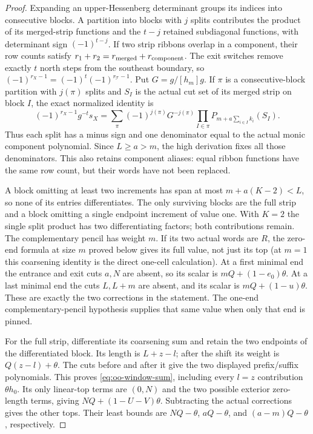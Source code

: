 \documentclass[11pt,a4paper]{amsart}
\numberwithin{equation}{section}
\theoremstyle{plain}
\theoremstyle{definition}
\begin{document}
\begin{proof}
Expanding an upper-Hessenberg determinant groups its indices into consecutive
blocks.  A partition into blocks with \(j\) splits contributes the product
of its merged-strip functions and the \(t-j\) retained subdiagonal functions,
with determinant sign \((-1)^{t-j}\).  If two strip ribbons overlap in a
component, their row counts satisfy
\(r_1+r_2=r_{\rm merged}+r_{\rm component}\).
The exit switches remove exactly \(t\) north steps from the southeast
boundary, so \((-1)^{r_X-1}=(-1)^t(-1)^{r_{\mathcal T}-1}\).
Put \(G=g/[h_m]g\).  If \(\pi\) is a consecutive-block partition with
\(j(\pi)\) splits and \(S_I\) is the actual cut set of its merged strip
on block \(I\), the exact normalized identity is
\[
 (-1)^{r_X-1}g^{-t}s_X
 =\sum_\pi(-1)^{j(\pi)}G^{-j(\pi)}
   \prod_{I\in\pi}P_{m+a\sum_{i\in I}k_i}(S_I).
\]
Thus each split has a minus sign and one denominator equal to the actual
monic component polynomial.  Since \(L\ge a>m\), the high derivation fixes
all those denominators.  This also retains component aliases: equal ribbon
functions have the same row count, but their words have not been replaced.

A block omitting at least two increments has span at most
\(m+a(K-2)<L\), so none of its entries differentiates.  The only surviving
blocks are the full strip and a block omitting a single endpoint increment
of value one.  With \(K=2\) the single split product has two differentiating
factors; both contributions remain.  The complementary pencil has weight
\(m\).  If its two actual words are \(R\), the zero-end formula at size \(m\)
proved below gives its full value, not just its top (at \(m=1\) this
coarsening identity is the direct one-cell calculation).  At a first minimal end
the entrance and exit cuts \(a,N\) are absent, so its scalar is
\(mQ+(1-e_0)\theta\).  At a last minimal end the cuts \(L,L+m\) are absent,
and its scalar is \(mQ+(1-u)\theta\).  These are exactly the two corrections
in the statement.  The one-end complementary-pencil hypothesis supplies
that same value when only that end is pinned.

For the full strip, differentiate its coarsening sum and retain the two
endpoints of the differentiated block.  Its length is \(L+z-l\); after the
shift its weight is \(Q(z-l)+\theta\).  The cuts before and after it give
the two displayed prefix/suffix polynomials.  This proves
\eqref{eq:oo-window-sum}, including every \(l=z\) contribution
\(\theta h_0\).  Its only linear-top terms are \((0,N)\) and the two possible
exterior zero-length terms, giving \(NQ+(1-U-V)\theta\).
Subtracting the actual corrections gives the other tops.  Their least bounds
are \(NQ-\theta\), \(aQ-\theta\), and \((a-m)Q-\theta\), respectively.


\end{proof}
\end{document}
